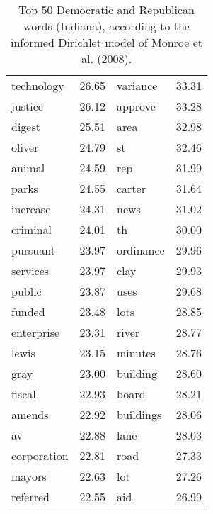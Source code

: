 \begin{table}[ht]
\begin{tabular}{lrlr}
  technology & 26.65 & variance & 33.31 \\ 
  justice & 26.12 & approve & 33.28 \\ 
  digest & 25.51 & area & 32.98 \\ 
  oliver & 24.79 & st & 32.46 \\ 
  animal & 24.59 & rep & 31.99 \\ 
  parks & 24.55 & carter & 31.64 \\ 
  increase & 24.31 & news & 31.02 \\ 
  criminal & 24.01 & th & 30.00 \\ 
  pursuant & 23.97 & ordinance & 29.96 \\ 
  services & 23.97 & clay & 29.93 \\ 
  public & 23.87 & uses & 29.68 \\ 
  funded & 23.48 & lots & 28.85 \\ 
  enterprise & 23.31 & river & 28.77 \\ 
  lewis & 23.15 & minutes & 28.76 \\ 
  gray & 23.00 & building & 28.60 \\ 
  fiscal & 22.93 & board & 28.21 \\ 
  amends & 22.92 & buildings & 28.06 \\ 
  av & 22.88 & lane & 28.03 \\ 
  corporation & 22.81 & road & 27.33 \\ 
  mayors & 22.63 & lot & 27.26 \\ 
  referred & 22.55 & aid & 26.99 \\ 
   \hline
\end{tabular}
\endgroup
\caption{Top 50 Democratic and Republican words (Indiana), according to the informed Dirichlet model of Monroe et al. (2008).} 
\label{tabFightinIN}
\end{table}

